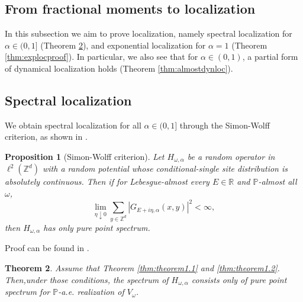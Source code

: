 \documentclass[11pt, a4paper, UKenglish, oneside]{book}
\theoremstyle{plain}
\newtheorem{theorem}{Theorem}
\newtheorem{proposition}[theorem]{Proposition}
\theoremstyle{remark}
\theoremstyle{definition}
\numberwithin{equation}{section}
\numberwithin{theorem}{section}
\begin{document}
\subsection{From fractional moments to localization}


In this subsection we aim to prove localization, namely spectral localization for $\alpha \in (0,1]$ (Theorem \ref{thm:simonwolfftheorem}), and exponential localization for $\alpha =1$ (Theorem \ref{thm:explocproof}). In particular, we also see that for $\alpha \in (0,1)$, a partial form of dynamical localization holds (Theorem \ref{thm:almostdynloc}).
 
\subsection*{Spectral localization}
We obtain spectral localization for all $\alpha \in (0,1]$ through the Simon-Wolff criterion, as shown in \cite{disertori2024}.
\begin{proposition}[Simon-Wolff criterion]\label{proposition:simonwolff}
    Let $H_{\omega,\alpha}$ be a random operator in $\ell^2(\mathbb{Z}^d)$ with a random potential whose conditional-single site distribution is absolutely continuous. Then if for Lebesgue-almost every $E\in\mathbb{R}$ and $\mathbb{P}$-almost all $\omega$, 
    \begin{equation}
        \lim_{\eta \downarrow 0}\sum_{y \in \mathbb{Z}^d}|G_{E+i\eta,\alpha}(x,y)|^2 < \infty,
    \end{equation}
    then $H_{\omega,\alpha}$ has only pure point spectrum.
\end{proposition}
Proof can be found in \cite[Chapter 5]{aizenman2015}.
\begin{theorem}\label{thm:simonwolfftheorem}
    Assume that Theorem \ref{thm:theorem1.1} and \ref{thm:theorem1.2}. Then,under those conditions, the spectrum of $H_{\omega,\alpha}$ consists only of pure point spectrum for $\mathbb{P}$-a.e. realization of $V_\omega$.
\end{theorem}
\end{document}
